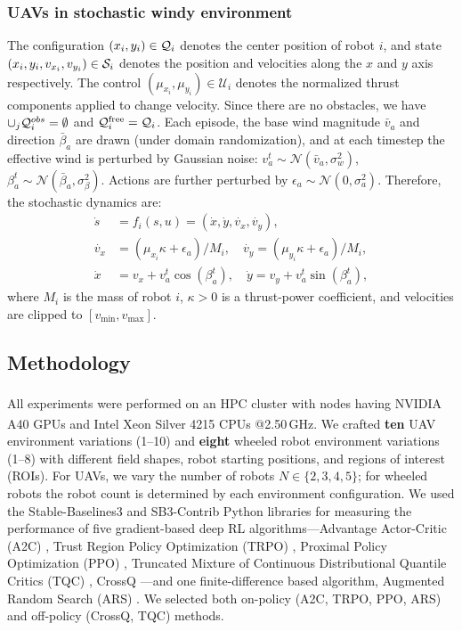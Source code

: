 \documentclass[letterpaper, 10 pt, conference]{ieeeconf}  %
\begin{document}
\subsubsection{UAVs in stochastic windy environment} The configuration $(x_i, y_i) \in \mathcal{Q}_i$ denotes the center position of robot $i$, and state $(x_i, y_i, v_{x_i}, v_{y_i}) \in \mathcal{S}_i$ denotes the position and velocities along the $x$ and $y$ axis respectively. The control $(\mu_{x_i}, \mu_{y_i}) \in \mathcal{U}_i$ denotes the normalized thrust components applied to change velocity. Since there are no obstacles, we have $\cup_j \mathcal{Q}_i^{obs} = \emptyset$ and $\mathcal{Q}_i^{\mathrm{free}} = \mathcal{Q}_i$. Each episode, the base wind magnitude $\bar{v}_a$ and direction $\bar{\beta}_a$ are drawn (under domain randomization), and at each timestep the effective wind is perturbed by Gaussian noise: $v_a^t \sim \mathcal{N}(\bar{v}_a, \sigma_w^2)$, $\beta_a^t \sim \mathcal{N}(\bar{\beta}_a, \sigma_\beta^2)$. Actions are further perturbed by $\epsilon_a \sim \mathcal{N}(0, \sigma_a^2)$. Therefore, the stochastic dynamics are:
\begin{align}
\dot{s} &= f_i(s,u) = (\dot{x}, \dot{y}, \dot{v_{x}}, \dot{v_{y}}),\\
\dot{v_x} &= (\mu_{x_i} \kappa + \epsilon_a) / M_i, \quad \dot{v_y} = (\mu_{y_i} \kappa + \epsilon_a) / M_i, \\
\dot{x} &= v_x + v_a^t \cos(\beta_a^t), \quad \dot{y} = v_y + v_a^t \sin(\beta_a^t),
\end{align}
where $M_i$ is the mass of robot $i$, $\kappa > 0$ is a thrust-power coefficient, and velocities are clipped to $[v_{\min}, v_{\max}]$.

\subsection{Methodology}
All experiments were performed on an HPC cluster with nodes having NVIDIA\textsuperscript{\textregistered} A40 GPUs and Intel\textsuperscript{\textregistered} Xeon\textsuperscript{\textregistered} Silver 4215 CPUs @2.50\,GHz. We crafted \textbf{ten} UAV environment variations (1–10) and \textbf{eight} wheeled robot environment variations (1–8) with different field shapes, robot starting positions, and regions of interest (ROIs). For UAVs, we vary the number of robots $N \in \{2, 3, 4, 5\}$; for wheeled robots the robot count is determined by each environment configuration. We used the Stable-Baselines3 and SB3-Contrib \cite{stable-baselines3} Python libraries for measuring the performance of five gradient-based deep RL algorithms—Advantage Actor-Critic (A2C) \cite{mnih2016a2c}, Trust Region Policy Optimization (TRPO) \cite{schulman2015trust}, Proximal Policy Optimization (PPO) \cite{schulman2017ppo}, Truncated Mixture of Continuous Distributional Quantile Critics (TQC) \cite{kuznetsov2020tqc}, CrossQ \cite{bhatt2024crossq}—and one finite-difference based algorithm, Augmented Random Search (ARS) \cite{mania2018ars}. We selected both on-policy (A2C, TRPO, PPO, ARS) and off-policy (CrossQ, TQC) methods.
\end{document}
